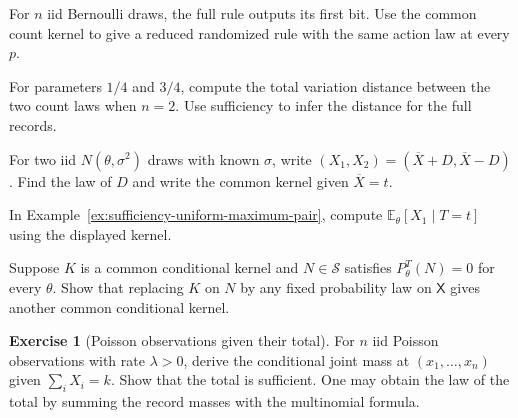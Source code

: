 \documentclass[11pt,oneside]{book}
\theoremstyle{definition}
\newtheorem{exercise}{Exercise}[section]
\theoremstyle{remark}
\begin{document}
\begin{practiceexercise}
\label{pex:sufficiency-reduce-first-bit-rule}
For $n$ iid Bernoulli draws, the full rule outputs its
first bit. Use the common count kernel to give a reduced
randomized rule with the same action law at every $p$.
\end{practiceexercise}

\begin{practiceexercise}
\label{pex:sufficiency-bernoulli-tv}
For parameters $1/4$ and $3/4$, compute the total variation
distance between the two count laws when $n=2$.
Use sufficiency to infer the distance for the full records.
\end{practiceexercise}

\begin{practiceexercise}
\label{pex:sufficiency-normal-two-draw-kernel}
For two iid $N(\theta,\sigma^2)$ draws with known $\sigma$,
write $(X_1,X_2)=(\overline X+D,\overline X-D)$. Find the
law of $D$ and write the common kernel given $\overline X=t$.
\end{practiceexercise}

\begin{practiceexercise}
\label{pex:sufficiency-uniform-maximum-conditional-moment}
In Example~\ref{ex:sufficiency-uniform-maximum-pair}, compute
$\mathbb E_\theta[X_1\mid T=t]$ using the displayed kernel.
\end{practiceexercise}

\begin{practiceexercise}
\label{pex:sufficiency-unused-statistic-values}
Suppose $K$ is a common conditional kernel and
$N\in\mathcal S$ satisfies $P_\theta^T(N)=0$ for every $\theta$.
Show that replacing $K$ on $N$ by any fixed probability law
on $\mathsf X$ gives another common conditional kernel.
\end{practiceexercise}

\begin{exercise}[Poisson observations given their total]
\label{exer:sufficiency-poisson-total}
For $n$ iid Poisson observations with rate $\lambda>0$, derive
the conditional joint mass at $(x_1,\ldots,x_n)$ given
$\sum_i X_i=k$. Show that the total is sufficient. One may
obtain the law of the total by summing the record masses
with the multinomial formula.
\end{exercise}
\end{document}
